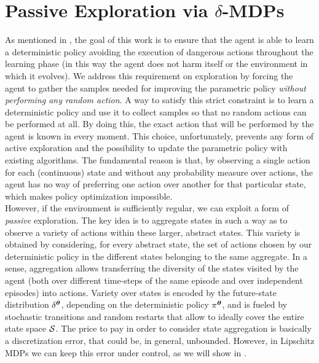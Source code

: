 \section{Passive Exploration via $\delta$-MDPs}\label{sec:deltamdp}
As mentioned in , the goal of this work is to ensure that the agent is able to learn a deterministic policy avoiding the execution of dangerous actions throughout the learning phase (in this way the agent does not harm itself or the environment in which it evolves). We address this requirement on exploration by forcing the agent to gather the samples needed for improving the parametric policy \emph{without performing any random action}. A way to satisfy this strict constraint is to learn a deterministic policy and use it to collect samples so that no random actions can be performed at all. By doing this, the exact action that will be performed by the agent is known in every moment. 
This choice, unfortunately, prevents any form of active exploration and the possibility to update the parametric policy with existing algorithms. The fundamental reason is that, by observing a single action for each (continuous) state and without any probability measure over actions, the agent has no way of preferring one action over another for that particular state, which makes policy optimization impossible.\\
\newline 
However, if the environment is sufficiently regular, we can exploit a form of \emph{passive} exploration. 
The key idea is to aggregate states in such a way as to observe a variety of actions within these larger, abstract states. This variety is obtained by considering, for every abstract state, the set of actions chosen by our deterministic policy in the different states belonging to the same aggregate. In a sense, aggregation allows transferring the diversity of the states visited by the agent (both over different time-steps of the same episode and over independent episodes) into actions. Variety over states is encoded by the future-state distribution $\delta^{\boldsymbol{\theta}}$, depending on the deterministic policy $\pi^{\boldsymbol{\theta}}$, and is fueled by stochastic transitions and random restarts that allow to ideally cover the entire state space $\mathcal{S}$.
The price to pay in order to consider state aggregation is basically a discretization error, that could be, in general, unbounded. However, in Lipschitz \ac{MDPs} we can keep this error under control, as we will show in .\\
